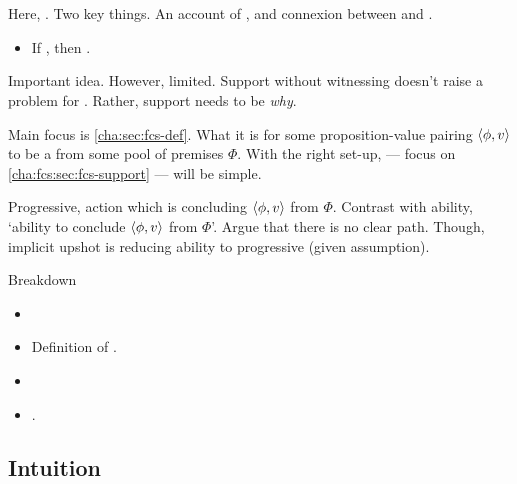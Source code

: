 \chapter{}
\label{cha:fcs}

\nocite{Ryle:1946tu}

\begin{note}
  Here, .
  Two key things.
  An account of , and connexion between  and .

  \begin{itemize}
  \item
    If \fc{}, then \ros{}.
  \end{itemize}

  Important idea.
  However, limited.
  Support without witnessing doesn't raise a problem for \issueConstraint{}.
  Rather, support needs to be \emph{why}.

  Main focus is \autoref{cha:sec:fcs-def}.
  What it is for some proposition-value pairing \(\langle \phi, v \rangle\) to be a \fc{} from some pool of premises \(\Phi\).
  With the right set-up,  --- focus on \autoref{cha:fcs:sec:fcs-support} --- will be simple.

  Progressive, action which is concluding \(\langle \phi, v \rangle\) from \(\Phi\).
  Contrast with ability, `ability to conclude \(\langle \phi, v \rangle\) from \(\Phi\)'.
  Argue that there is no clear path.
  Though, implicit upshot is reducing ability to progressive (given assumption).
\end{note}

\begin{note}
  Breakdown
  \begin{itemize}
  \item
  \item

    Definition of .
  \item
  \item

    \ros{}.
  \end{itemize}
\end{note}

\section{Intuition}
\label{sec:intuition}

